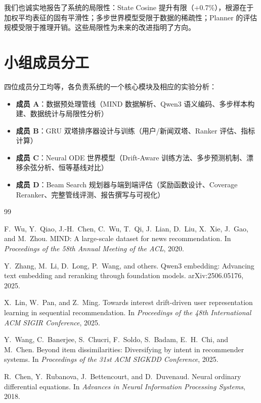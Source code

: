 \documentclass[twocolumn,10pt,a4paper]{ctexart}
\begin{document}
我们也诚实地报告了系统的局限性：State Cosine 提升有限（+0.7\%），根源在于加权平均表征的固有平滑性；多步世界模型受限于数据的稀疏性；Planner 的评估规模受限于推理开销。这些局限性为未来的改进指明了方向。

\section*{小组成员分工}

四位成员分工均等，各负责系统的一个核心模块及相应的实验分析：

\begin{itemize}
\item \textbf{成员 A}：数据预处理管线（MIND 数据解析、Qwen3 语义编码、多步样本构建、数据统计与局限性分析）
\item \textbf{成员 B}：GRU 双塔排序器设计与训练（用户/新闻双塔、Ranker 评估、指标计算）
\item \textbf{成员 C}：Neural ODE 世界模型（Drift-Aware 训练方法、多步预测机制、漂移余弦分析、恒等基线对比）
\item \textbf{成员 D}：Beam Search 规划器与端到端评估（奖励函数设计、Coverage Reranker、完整管线评测、报告撰写与可视化）
\end{itemize}

\vspace{1em}

\begin{thebibliography}{99}

F.~Wu, Y.~Qiao, J.-H.~Chen, C.~Wu, T.~Qi, J.~Lian, D.~Liu, X.~Xie, J.~Gao, and M.~Zhou.
\newblock MIND: A large-scale dataset for news recommendation.
\newblock In \emph{Proceedings of the 58th Annual Meeting of the ACL}, 2020.

Y.~Zhang, M.~Li, D.~Long, P.~Wang, and others.
\newblock Qwen3 embedding: Advancing text embedding and reranking through foundation models.
\newblock arXiv:2506.05176, 2025.

X.~Lin, W.~Pan, and Z.~Ming.
\newblock Towards interest drift-driven user representation learning in sequential recommendation.
\newblock In \emph{Proceedings of the 48th International ACM SIGIR Conference}, 2025.

Y.~Wang, C.~Banerjee, S.~Chucri, F.~Soldo, S.~Badam, E.~H.~Chi, and M.~Chen.
\newblock Beyond item dissimilarities: Diversifying by intent in recommender systems.
\newblock In \emph{Proceedings of the 31st ACM SIGKDD Conference}, 2025.

R.~Chen, Y.~Rubanova, J.~Bettencourt, and D.~Duvenaud.
\newblock Neural ordinary differential equations.
\newblock In \emph{Advances in Neural Information Processing Systems}, 2018.

\end{thebibliography}
\end{document}
